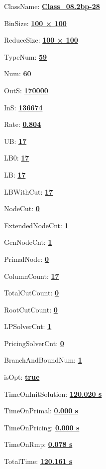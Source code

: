 \documentclass[11pt]{article}
\begin{document}
\pagestyle{empty}


ClassName: \underline{\textbf{Class_08.2bp-28}}
\par
BinSize: \underline{\textbf{100 × 100}}
\par
ReduceSize: \underline{\textbf{100 × 100}}
\par
TypeNum: \underline{\textbf{59}}
\par
Num: \underline{\textbf{60}}
\par
OutS: \underline{\textbf{170000}}
\par
InS: \underline{\textbf{136674}}
\par
Rate: \underline{\textbf{0.804}}
\par
UB: \underline{\textbf{17}}
\par
LB0: \underline{\textbf{17}}
\par
LB: \underline{\textbf{17}}
\par
LBWithCut: \underline{\textbf{17}}
\par
NodeCut: \underline{\textbf{0}}
\par
ExtendedNodeCnt: \underline{\textbf{1}}
\par
GenNodeCnt: \underline{\textbf{1}}
\par
PrimalNode: \underline{\textbf{0}}
\par
ColumnCount: \underline{\textbf{17}}
\par
TotalCutCount: \underline{\textbf{0}}
\par
RootCutCount: \underline{\textbf{0}}
\par
LPSolverCnt: \underline{\textbf{1}}
\par
PricingSolverCnt: \underline{\textbf{0}}
\par
BranchAndBoundNum: \underline{\textbf{1}}
\par
isOpt: \underline{\textbf{true}}
\par
TimeOnInitSolution: \underline{\textbf{120.020 s}}
\par
TimeOnPrimal: \underline{\textbf{0.000 s}}
\par
TimeOnPricing: \underline{\textbf{0.000 s}}
\par
TimeOnRmp: \underline{\textbf{0.078 s}}
\par
TotalTime: \underline{\textbf{120.161 s}}
\par
\newpage


\end{document}
